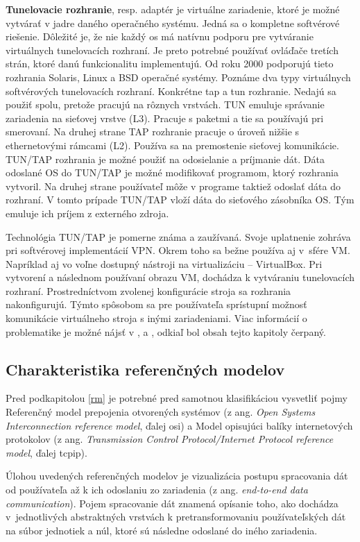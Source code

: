 \textbf{Tunelovacie rozhranie}, resp. adaptér je virtuálne zariadenie, ktoré je možné vytvárať v jadre daného operačného systému. Jedná sa o kompletne softvérové riešenie. Dôležité je, že nie každý \acrshort{os} má natívnu podporu pre vytváranie virtuálnych tunelovacích rozhraní. Je preto potrebné používať ovláďače tretích strán, ktoré danú funkcionalitu implementujú. Od roku 2000 podporujú tieto rozhrania Solaris, Linux a BSD operačné systémy. Poznáme dva typy virtuálnych softvérových tunelovacích rozhraní. Konkrétne \acrshort{tap} a \acrshort{tun} rozhranie. Nedajú sa použiť spolu, pretože pracujú na rôznych vrstvách. TUN emuluje správanie zariadenia na sieťovej vrstve (L3). Pracuje s paketmi a tie sa používajú pri smerovaní. Na druhej strane TAP rozhranie pracuje o úroveň nižšie s ethernetovými rámcami (L2). Používa sa na premostenie sieťovej komunikácie. TUN/TAP rozhrania je možné použiť na odosielanie a príjmanie dát. Dáta odoslané OS do TUN/TAP je možné modifikovať programom, ktorý rozhrania vytvoril. Na druhej strane používateľ môže v programe taktiež odoslať dáta do rozhraní. V tomto prípade TUN/TAP vloží dáta do sieťového zásobníka OS. Tým emuluje ich príjem z externého zdroja. 

Technológia TUN/TAP je pomerne známa a zaužívaná. Svoje uplatnenie zohráva pri softvérovej implementácií VPN. Okrem toho sa bežne používa aj v~sfére VM. Napríklad aj vo voľne dostupný nástroji na virtualizáciu -- VirtualBox. Pri vytvorení a následnom používaní obrazu VM, dochádza k vytváraniu tunelovacích rozhraní. Prostredníctvom zvolenej konfigurácie stroja sa rozhrania nakonfigurujú. Týmto spôsobom sa pre používateľa sprístupní možnosť komunikácie virtuálneho stroja s inými zariadeniami. 
Viac informácií o problematike je možné nájsť v \cite{tunel}, \cite{tuntap} a \cite{tun}, odkiaľ bol obsah tejto kapitoly čerpaný.     

\subsection{Charakteristika referenčných modelov}\label{crm}
Pred podkapitolou \ref{rm} je potrebné pred samotnou klasifikáciou vysvetliť pojmy Referenčný model prepojenia otvorených systémov (z ang. \textit{Open Systems Interconnection reference model}, ďalej \acrshort{osi}) a Model opisujúci balíky internetových protokolov (z ang. \textit{Transmission Control Protocol/Internet Protocol reference model}, ďalej \acrshort{tcpip}).

Úlohou uvedených referenčných modelov je vizualizácia postupu spracovania dát od používateľa až k ich odoslaniu zo zariadenia (z ang. \textit{end-to-end data communication}). Pojem spracovanie dát znamená opísanie toho, ako dochádza v~jednotlivých abstraktných vrstvách k pretransformovaniu používateľských dát na súbor jednotiek a núl, ktoré sú následne odoslané do iného zariadenia. 

